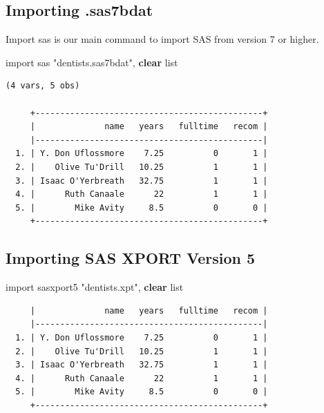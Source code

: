 \documentclass[
]{book}
\newenvironment{Shaded}{\begin{snugshade}}{\end{snugshade}}
\newcommand{\KeywordTok}[1]{\textcolor[rgb]{0.13,0.29,0.53}{\textbf{#1}}}
\newcommand{\NormalTok}[1]{#1}
\newcommand{\OtherTok}[1]{\textcolor[rgb]{0.56,0.35,0.01}{#1}}
\newcommand{\StringTok}[1]{\textcolor[rgb]{0.31,0.60,0.02}{#1}}
\begin{document}
\subsection{Importing .sas7bdat}\label{importing-.sas7bdat}

Import sas is our main command to import SAS from version 7 or higher.

\begin{Shaded}
\begin{Highlighting}[]
\NormalTok{import sas }\StringTok{"dentists.sas7bdat"}\NormalTok{, }\KeywordTok{clear}
\OtherTok{list}
\end{Highlighting}
\end{Shaded}

\begin{verbatim}
(4 vars, 5 obs)

     +----------------------------------------------+
     |              name   years   fulltime   recom |
     |----------------------------------------------|
  1. | Y. Don Uflossmore    7.25          0       1 |
  2. |    Olive Tu'Drill   10.25          1       1 |
  3. | Isaac O'Yerbreath   32.75          1       1 |
  4. |      Ruth Canaale      22          1       1 |
  5. |        Mike Avity     8.5          0       0 |
     +----------------------------------------------+
\end{verbatim}

\subsection{Importing SAS XPORT Version 5}\label{importing-sas-xport-version-5}

\begin{Shaded}
\begin{Highlighting}[]
\NormalTok{import sasxport5 }\StringTok{"dentists.xpt"}\NormalTok{, }\KeywordTok{clear}
\OtherTok{list}
\end{Highlighting}
\end{Shaded}

\begin{verbatim}
     |              name   years   fulltime   recom |
     |----------------------------------------------|
  1. | Y. Don Uflossmore    7.25          0       1 |
  2. |    Olive Tu'Drill   10.25          1       1 |
  3. | Isaac O'Yerbreath   32.75          1       1 |
  4. |      Ruth Canaale      22          1       1 |
  5. |        Mike Avity     8.5          0       0 |
     +----------------------------------------------+
\end{verbatim}
\end{document}
